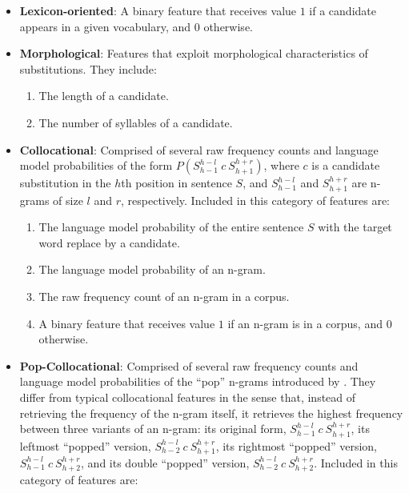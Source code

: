 \begin{itemize}
\item \textbf{Lexicon-oriented}: A binary feature that receives value $1$ if a candidate appears in a given vocabulary, and $0$ otherwise.

\item \textbf{Morphological}: Features that exploit morphological characteristics of substitutions. They include:

\begin{enumerate}
	\item The length of a candidate.
	\item The number of syllables of a candidate.
\end{enumerate}

\item \textbf{Collocational}: Comprised of several raw frequency counts and language model probabilities of the form $P\left ( S_{h-1}^{h-l} \: c \: S_{h+1}^{h+r} \right )$, where $c$ is a candidate substitution in the $h$th position in sentence $S$, and $S_{h-1}^{h-l}$ and $S_{h+1}^{h+r}$ are n-grams of size $l$ and $r$, respectively. Included in this category of features are:

\begin{enumerate}
	\item The language model probability of the entire sentence $S$ with the target word replace by a candidate.
	\item The language model probability of an n-gram.
	\item The raw frequency count of an n-gram in a corpus.
	\item A binary feature that receives value $1$ if an n-gram is in a corpus, and $0$ otherwise.
\end{enumerate}

\item \textbf{Pop-Collocational}: Comprised of several raw frequency counts and language model probabilities of the ``pop'' n-grams introduced by \cite{uowshef}. They differ from typical collocational features in the sense that, instead of retrieving the frequency of the n-gram itself, it retrieves the highest frequency between three variants of an n-gram: its original form, $S_{h-1}^{h-l} \: c \: S_{h+1}^{h+r}$, its leftmost ``popped'' version, $S_{h-2}^{h-l} \: c \: S_{h+1}^{h+r}$, its rightmost ``popped'' version, $S_{h-1}^{h-l} \: c \: S_{h+2}^{h+r}$, and its double ``popped'' version, $S_{h-2}^{h-l} \: c \: S_{h+2}^{h+r}$. Included in this category of features are:


\end{itemize}
